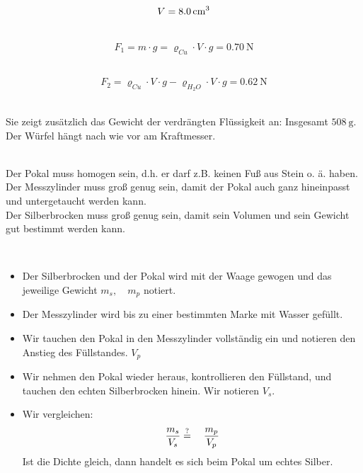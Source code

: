 \documentclass[a4paper]{article}
\begin{document}
\vspace{0.5 cm}


\\
$$V= \SI{8,0}{\centi{\meter^3}}$$
\vspace{0.5 cm}

\\
$$ F_1 = m\cdot g = \varrho_{Cu}\cdot V \cdot g = \SI{0,70}{\newton} $$
\vspace{0.5 cm}

\\
$$ F_2 = \varrho_{Cu}\cdot V \cdot g - \varrho_{H_2O}\cdot V \cdot g = \SI{0,62}{\newton} $$
\vspace{0.5 cm}

\\
Sie zeigt zusätzlich das Gewicht der verdrängten Flüssigkeit an: Insgesamt $\SI{508}{\gram}$. Der Würfel hängt nach wie vor am Kraftmesser.
\vspace{0.5 cm}

\\
Der Pokal muss homogen sein, d.h. er darf z.B. keinen Fuß aus Stein o. ä. haben.\\
Der Messzylinder muss groß genug sein, damit der Pokal auch ganz hineinpasst und untergetaucht werden kann.\\
Der Silberbrocken muss groß genug sein, damit sein Volumen und sein Gewicht gut bestimmt werden kann.
\vspace{0.5 cm}
 
\\
\begin{itemize}
 \item Der Silberbrocken und der Pokal wird mit der Waage gewogen und das jeweilige Gewicht $m_s, \quad m_p$ notiert.
\item Der Messzylinder wird bis zu einer bestimmten Marke mit Wasser gefüllt.
\item Wir tauchen den Pokal in den Messzylinder vollständig ein und notieren den Anstieg des Füllstandes. $V_p$
\item Wir nehmen den Pokal wieder heraus, kontrollieren den Füllstand, und tauchen den echten Silberbrocken hinein. Wir notieren $V_s$.
\item Wir vergleichen: $$ {m_s \over V_s} \stackrel{?}{=} \quad {m_p \over V_p}  $$ Ist die Dichte gleich, dann handelt es sich beim Pokal um echtes Silber.
\end{itemize}
 
\end{document}

